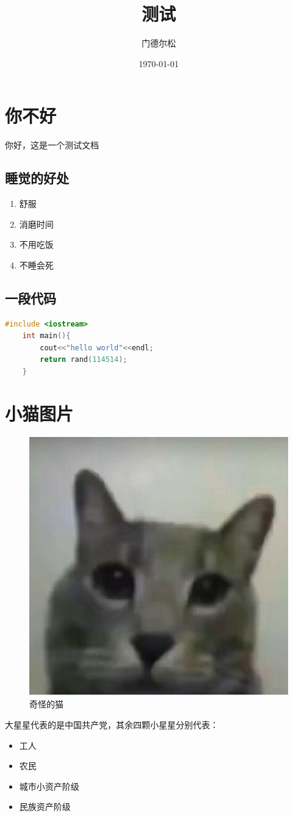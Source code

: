 \documentclass{article}
\title{测试}
\author{门德尔松}
\date{\today}
\begin{document}
\maketitle
\section{你不好}
你好，这是一个测试文档
\subsection{睡觉的好处}
\begin{enumerate}
	\item 舒服
	\item 消磨时间
	\item 不用吃饭
	\item 不睡会死
\end{enumerate}
\subsection{一段代码}
\begin{lstlisting}[language=c++]
	#include <iostream>
	int main(){
		cout<<"hello world"<<endl;
		return rand(114514);
	}
\end{lstlisting}

\pagebreak
 
\section{小猫图片}

\begin{figure}[h]
	\centering
	\includegraphics[width=0.3\linewidth]{strange_cat}
	\caption{奇怪的猫}
	\label{fig:strangecat}
\end{figure}
大星星代表的是中国共产党，其余四颗小星星分别代表：
\begin{itemize}
	\item 工人
	\item 农民
	\item 城市小资产阶级
	\item 民族资产阶级
\end{itemize}

 
\end{document}

